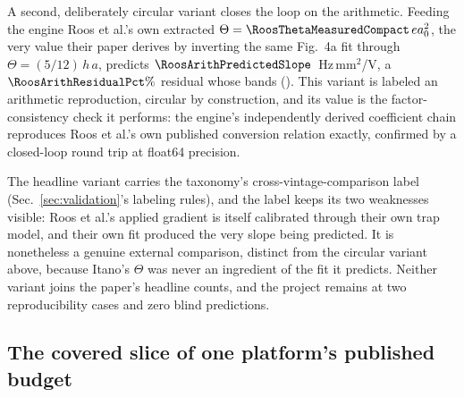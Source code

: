\documentclass[aps,pra,superscriptaddress,groupedaddress,nofootinbib]{revtex4-2}
\begin{document}
A second, deliberately circular variant closes the loop on the
arithmetic. Feeding the engine Roos et al.'s own extracted
$\Theta=\RoosThetaMeasuredCompact\,ea_0^2$, the very
value their paper derives by inverting the same Fig.~4a fit through
$\Theta=(5/12)\,h\,a$, predicts
$\RoosArithPredictedSlope$~Hz\,mm$^2$/V, a $\RoosArithResidualPct\%$
residual whose bands \RoosArithBandsOverlap{} (\textit{\RoosArithVerdict}). This
variant is labeled an arithmetic reproduction, circular by
construction, and its value is the factor-consistency check it
performs: the engine's independently derived coefficient chain
reproduces Roos et al.'s own published conversion relation exactly,
confirmed by a closed-loop round trip at float64 precision.

The headline variant carries the taxonomy's cross-vintage-comparison
label (Sec.~\ref{sec:validation}'s labeling rules), and the label
keeps its two weaknesses visible: Roos et al.'s applied gradient is
itself calibrated through their own trap model, and their own fit
produced the very slope being predicted. It is nonetheless a genuine
external comparison, distinct from the circular variant above, because
Itano's $\Theta$ was never an ingredient of the fit it predicts.
Neither variant joins the paper's headline counts, and the project
remains at two reproducibility cases and zero blind predictions.

\subsection{The covered slice of one platform's published budget}
\label{sec:budget-slice}
\end{document}

